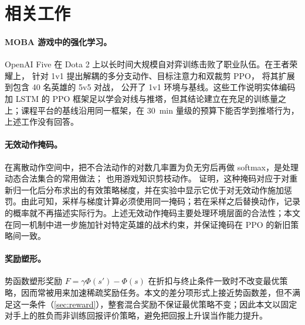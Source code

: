 \section{相关工作}
\label{sec:related}

\paragraph{MOBA 游戏中的强化学习。}
OpenAI Five 在 Dota 2 上以长时间大规模自对弈训练击败了职业队伍\cite{berner2019dota}。在王者荣耀上，\textcite{ye2020mastering} 针对 1v1 提出解耦的多分支动作、目标注意力和双裁剪 PPO，\textcite{ye2020full} 将其扩展到包含 \num{40} 名英雄的 5v5 对战，\textcite{wei2022hok} 公开了 1v1 环境与基线\cite{hoksource}。这些工作说明实体编码加 LSTM 的 PPO 框架足以学会对线与推塔，但其结论建立在充足的训练量之上；课程平台的基线沿用同一框架\cite{kaiwu63}，在 \qty{30}{\minute} 量级的预算下能否学到推塔行为，上述工作没有回答。

\paragraph{无效动作掩码。}
在离散动作空间中，把不合法动作的对数几率置为负无穷后再做 softmax，是处理动态合法集合的常用做法；\textcite{ye2020mastering} 也用游戏知识剪枝动作。\textcite{huang2022masking} 证明，这种掩码对应于对重新归一化后分布求出的有效策略梯度，并在实验中显示它优于对无效动作施加惩罚。由此可知，采样与梯度计算必须使用同一掩码；若在采样之后替换动作，记录的概率就不再描述实际行为。上述无效动作掩码主要处理环境层面的合法性；本文在同一机制中进一步施加针对特定英雄的战术约束，并保证掩码在 PPO 的新旧策略间一致。

\paragraph{奖励塑形。}
势函数塑形奖励 $F=\gamma\Phi(s')-\Phi(s)$ 在折扣与终止条件一致时不改变最优策略\cite{ng1999}，因而常被用来加速稀疏奖励任务。本文的差分项形式上接近势函数差，但不满足这一条件（\cref{sec:reward}），整套混合奖励不保证最优策略不变；因此本文以固定对手上的胜负而非训练回报评价策略，避免把回报上升误当作能力提升。

